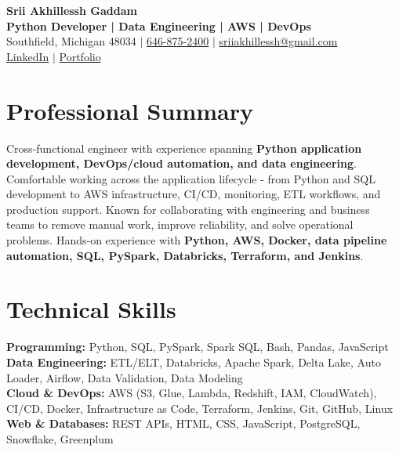 \documentclass[letterpaper,10pt]{article}
\begin{document}
\fontsize{9.35pt}{10.45pt}\selectfont

\begin{center}
    {\LARGE \textbf{Srii Akhillessh Gaddam}} \\[-1pt]
    \textbf{Python Developer | Data Engineering | AWS | DevOps} \\[2pt]
    Southfield, Michigan 48034 $|$
    \href{tel:6468752400}{646-875-2400} $|$
    \href{mailto:sriiakhillessh@gmail.com}{sriiakhillessh@gmail.com} \\[1pt]
    \href{https://www.linkedin.com/in/srii-akhiilessh-gaddam-b48668191/}{LinkedIn} $|$
    \href{https://sriiakhillesshg.github.io/portfolio/}{Portfolio}
\end{center}
\vspace{-8pt}

\section{Professional Summary}
\small{Cross-functional engineer with experience spanning \textbf{Python application development, DevOps/cloud automation, and data engineering}. Comfortable working across the application lifecycle - from Python and SQL development to AWS infrastructure, CI/CD, monitoring, ETL workflows, and production support. Known for collaborating with engineering and business teams to remove manual work, improve reliability, and solve operational problems. Hands-on experience with \textbf{Python, AWS, Docker, data pipeline automation, SQL, PySpark, Databricks, Terraform, and Jenkins}.}

\section{Technical Skills}
\small{
\textbf{Programming:} Python, SQL, PySpark, Spark SQL, Bash, Pandas, JavaScript \\
\textbf{Data Engineering:} ETL/ELT, Databricks, Apache Spark, Delta Lake, Auto Loader, Airflow, Data Validation, Data Modeling \\
\textbf{Cloud \& DevOps:} AWS (S3, Glue, Lambda, Redshift, IAM, CloudWatch), CI/CD, Docker, Infrastructure as Code, Terraform, Jenkins, Git, GitHub, Linux \\
\textbf{Web \& Databases:} REST APIs, HTML, CSS, JavaScript, PostgreSQL, Snowflake, Greenplum
}
\end{document}

